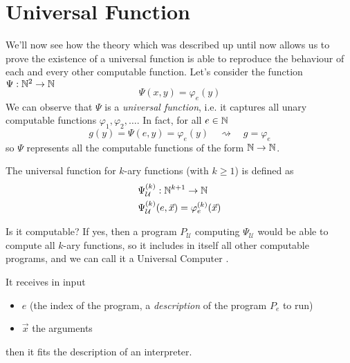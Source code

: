 \chapter {Universal Function}
\newcommand{\Psiex}{\ensuremath{\Psi_{\mathcal{U}}^{(k)} (e, \vec{x})}}
\newcommand{\Psiuex}{\ensuremath{\Psi_e^{(k)} (\vec{x})}}
\newcommand{\univ}{\ensuremath{\Psi_{\mathcal{U}}}}
We'll now see how the theory which was described up until now allows us to
prove the existence of a
universal function is able to reproduce the behaviour of each
and every other computable function. 
Let's consider the function $\Psi : \mathbb{N}^{2} \rightarrow \mathbb{N}$
\[
  \Psi(x,y) = \varphi_e(y)
\]
We can observe that $\Psi$ is a \emph{universal function}, i.e. it
captures all unary computable functions $\varphi_1, \varphi_2, \dots$. In fact,
for all $e \in \mathbb{N}$
\[
  g(y) = \Psi(e,y) = \varphi_e(y) \quad \rightsquigarrow \quad g = \varphi_e
\]
so $\Psi$ represents all the computable functions of the
form $\mathbb{N} \to \mathbb{N}$.

\begin{definition}
  The universal function for $k$-ary functions (with $k \geq 1$) is
  defined as
  \begin{align*}
    &\univ^{(k)} : \nat^{k+1} \rightarrow \nat \\
    &\Psiex = \varphi_e^{(k)}(\vec{x})
  \end{align*}
\end{definition}
Is it computable? If yes, then a program $P_{\mathcal{U}}$ computing $\univ$ would
be able to compute all $k$-ary functions, so it includes in itself all
other computable programs, and we can call it a Universal Computer
\cite{davis:2011}.

It receives in
input
\begin{itemize}
\item $e$ (the index of the program, a \textit{description} of the
  program $P_e$ to run)
\item $\vec{x}$ the arguments
\end{itemize}
then it fits the description of an interpreter.


